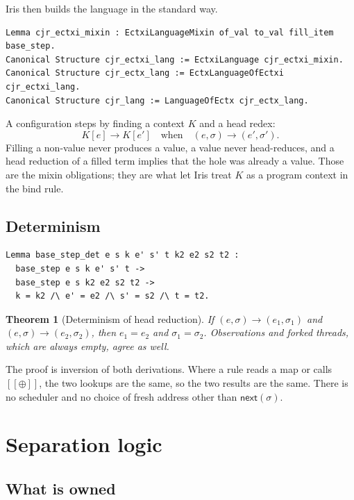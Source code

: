\documentclass[11pt]{article}
\newtheorem{theorem}{Theorem}
\newcommand{\sem}[1]{[\![#1]\!]}
\newcommand{\step}{\longrightarrow}
\begin{document}
Iris then builds the language in the standard way.

\begin{lstlisting}
Lemma cjr_ectxi_mixin : EctxiLanguageMixin of_val to_val fill_item base_step.
Canonical Structure cjr_ectxi_lang := EctxiLanguage cjr_ectxi_mixin.
Canonical Structure cjr_ectx_lang := EctxLanguageOfEctxi cjr_ectxi_lang.
Canonical Structure cjr_lang := LanguageOfEctx cjr_ectx_lang.
\end{lstlisting}

A configuration steps by finding a context \(K\) and a head redex:
\[
K[e] \step K[e']
\quad\text{when}\quad
(e,\sigma)\step(e',\sigma').
\]
Filling a non-value never produces a value, a value never head-reduces, and a head reduction of a filled term implies that the hole was already a value.
Those are the mixin obligations; they are what let Iris treat \(K\) as a program context in the bind rule.

\subsection{Determinism}

\begin{lstlisting}
Lemma base_step_det e s k e' s' t k2 e2 s2 t2 :
  base_step e s k e' s' t ->
  base_step e s k2 e2 s2 t2 ->
  k = k2 /\ e' = e2 /\ s' = s2 /\ t = t2.
\end{lstlisting}

\begin{theorem}[Determinism of head reduction]
If \((e,\sigma)\step(e_1,\sigma_1)\) and \((e,\sigma)\step(e_2,\sigma_2)\), then \(e_1=e_2\) and \(\sigma_1=\sigma_2\).
Observations and forked threads, which are always empty, agree as well.
\end{theorem}

The proof is inversion of both derivations.
Where a rule reads a map or calls \(\sem{\oplus}\), the two lookups are the same, so the two results are the same.
There is no scheduler and no choice of fresh address other than \(\mathsf{next}(\sigma)\).

\section{Separation logic}

\subsection{What is owned}
\end{document}

